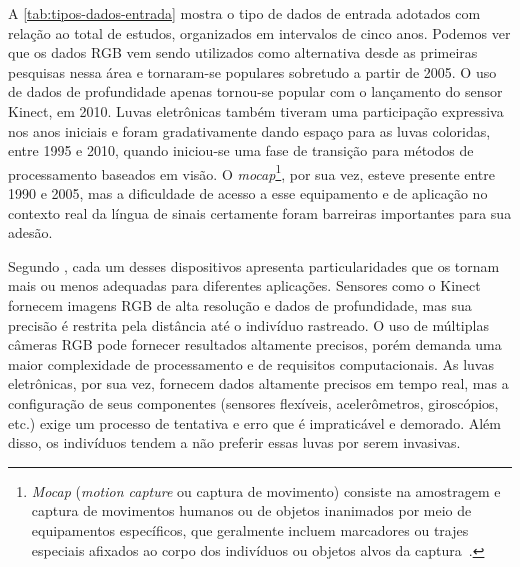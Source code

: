 A \autoref{tab:tipos-dados-entrada} mostra o tipo de dados de entrada adotados com relação ao total de estudos, organizados em intervalos de cinco anos. Podemos ver que os dados RGB vem sendo utilizados como alternativa desde as primeiras pesquisas nessa área e tornaram-se populares sobretudo a partir de 2005. O uso de dados de profundidade apenas tornou-se popular com o lançamento do sensor Kinect, em 2010. Luvas eletrônicas também tiveram uma participação expressiva nos anos iniciais e foram gradativamente dando espaço para as luvas coloridas, entre 1995 e 2010, quando iniciou-se uma fase de transição para métodos de processamento baseados em visão. O \textit{mocap}\footnote{
    \textit{Mocap} (\textit{motion capture} ou captura de movimento) consiste na amostragem e captura de movimentos humanos ou de objetos inanimados por meio de equipamentos específicos, que geralmente incluem marcadores ou trajes especiais afixados ao corpo dos indivíduos ou objetos alvos da captura~\cite{kitagawa-2017-mocap}.
}, por sua vez, esteve presente entre 1990 e 2005, mas a dificuldade de acesso a esse equipamento e de aplicação no contexto real da língua de sinais certamente foram barreiras importantes para sua adesão.



Segundo , cada um desses dispositivos apresenta particularidades que os tornam mais ou menos adequadas para diferentes aplicações. Sensores como o Kinect fornecem imagens RGB de alta resolução e dados de profundidade, mas sua precisão é restrita pela distância até o indivíduo rastreado. O uso de múltiplas câmeras RGB pode fornecer resultados altamente precisos, porém demanda uma maior complexidade de processamento e de requisitos computacionais. As luvas eletrônicas, por sua vez, fornecem dados altamente precisos em tempo real, mas a configuração de seus componentes (sensores flexíveis, acelerômetros, giroscópios, etc.) exige um processo de tentativa e erro que é impraticável e demorado. Além disso, os indivíduos tendem a não preferir essas luvas por serem invasivas.




